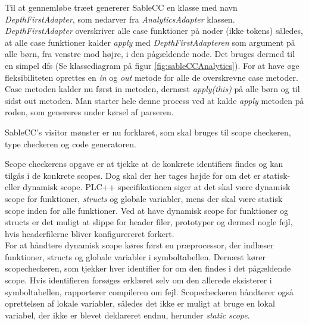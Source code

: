 Til at gennemløbe træet genererer SableCC en klasse med navn \textit{DepthFirstAdapter}, som nedarver fra \textit{AnalyticsAdapter} klassen. \textit{DepthFirstAdapter} overskriver alle case funktioner på noder (ikke tokens) således, at alle case funktioner kalder \textit{apply} med \textit{DepthFirstAdapteren} som argument på alle børn, fra venstre mod højre, i den pågældende node. Det bruges dermed til en simpel \gls{dfs} (Se klassediagram på figur \ref{fig:sableCCAnalytics}). For at have øge fleksibiliteten oprettes en \textit{in} og \textit{out} metode for alle de overskrevne case metoder. Case metoden kalder nu først in metoden, dernæst \textit{apply(this)} på alle børn og til sidst out metoden. Man starter hele denne process ved at kalde \textit{apply} metoden på roden, som genereres under kørsel af parseren.\\




\noindent SableCC's visitor mønster er nu forklaret, som skal bruges til scope checkeren, type checkeren og code generatoren.

Scope checkerens opgave er at tjekke at de konkrete identifiers findes og kan tilgås i de konkrete scopes. Dog skal der her tages højde for om det er statisk- eller dynamisk scope. PLC++ specifikationen siger at det skal være dynamisk scope for funktioner, \textit{structs} og globale variabler, mens der skal være statisk scope inden for alle funktioner. Ved at have dynamisk scope for funktioner og structs er det muligt at slippe for header filer, prototyper og dermed nogle fejl, hvis headerfilerne bliver konfigurereret forkert.\\

\noindent For at håndtere dynamisk scope køres først en præprocessor, der indlæser funktioner, structs og globale variabler i symboltabellen. Dernæst kører scopecheckeren, som tjekker hver  identifier for om den findes i det pågældende scope. Hvis identifieren forsøges erklæret selv om den allerede eksisterer i symboltabellen, rapporterer compileren om fejl. Scopecheckeren håndterer også oprettelsen af lokale variabler, således det ikke er muligt at bruge en lokal variabel, der ikke er blevet deklareret endnu, herunder \textit{static scope}.\\

